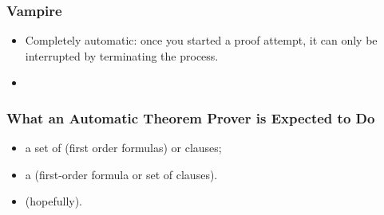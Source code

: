 


                      \begin{frame}
                 \frametitle{Vampire}


\begin{itemize}
\item \alert{Completely automatic:} once you started a proof attempt,
  it can only be interrupted by terminating the process.\\[1em]


\item {}
\end{itemize}

                               \end{frame}


                               \begin{frame}
              \frametitle{What an Automatic Theorem Prover
                is Expected to Do}


\begin{itemize}
  \item a set of  (first order formulas) or clauses;

  \item a  (first-order formula or set of clauses).
\end{itemize}


\begin{itemize}
  \item {} (hopefully).
\end{itemize}

                               \end{frame}

